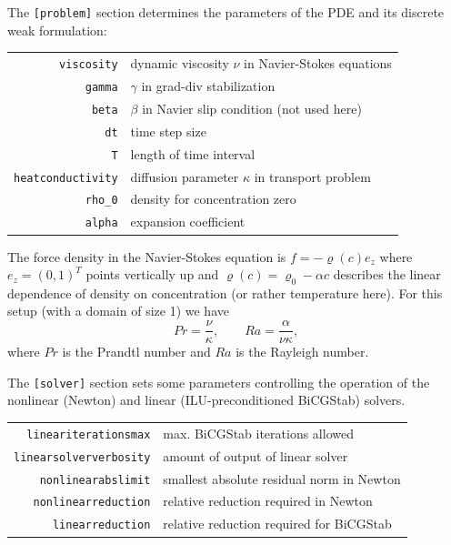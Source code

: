 \documentclass[a4paper,12pt]{article}
\theoremstyle{definition}
\begin{document}
The \lstinline{[problem]} section determines the parameters of the PDE and its discrete
weak formulation:

\begin{tabular}{rl}
\texttt{viscosity} &  dynamic viscosity $\nu$ in Navier-Stokes equations\\
\texttt{gamma} & $\gamma$ in grad-div stabilization\\
\texttt{beta} & $\beta$ in Navier slip condition (not used here)\\
\texttt{dt} & time step size\\
\texttt{T} & length of time interval\\
\texttt{heatconductivity} & diffusion parameter $\kappa$ in transport problem\\
\texttt{rho\_0} & density for concentration zero\\
\texttt{alpha} & expansion coefficient 
\end{tabular}

The force density in the Navier-Stokes equation is $f = - \varrho(c) e_z$ where $e_z=(0,1)^T$ points
vertically up and $\varrho(c) = \varrho_0 - \alpha c$ describes the linear dependence of density on
concentration (or rather temperature here). For this setup (with a domain of size 1) we have
\begin{equation*}
Pr = \frac{\nu}{\kappa}, \qquad Ra = \frac{\alpha}{\nu\kappa},
\end{equation*}
where $Pr$ is the Prandtl number and $Ra$ is the Rayleigh number.

The \lstinline{[solver]} section sets some parameters controlling the operation of the
nonlinear (Newton) and linear (ILU-preconditioned BiCGStab) solvers.

\begin{tabular}{rl}
\texttt{lineariterationsmax} &  max. BiCGStab iterations allowed\\
\texttt{linearsolververbosity} & amount of output of linear solver\\
\texttt{nonlinearabslimit} & smallest absolute residual norm in Newton\\
\texttt{nonlinearreduction} & relative reduction required in Newton\\
\texttt{linearreduction} & relative reduction required for BiCGStab
\end{tabular}
\end{document}
